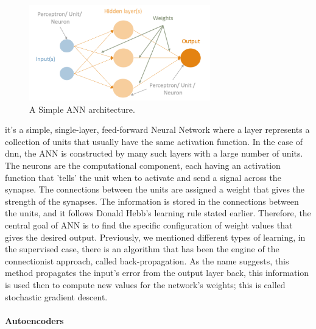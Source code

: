\begin{figure}[!htb]
  \centering\includegraphics[width=0.7\textwidth,height=0.7\textheight,keepaspectratio]{Images/ANN/Basic_ANN.png}
    \caption{A Simple ANN architecture. }
    \label{fig:ann_basic}
\end{figure}
\FloatBarrier

 it's a simple, single-layer, feed-forward Neural Network where a layer represents a collection of units that usually have the same activation function. In the case of \acrfull{dnn}, the ANN is constructed by many such layers with a large number of units. The neurons are the computational component, each having an activation function that 'tells' the unit when to activate and send a signal across the synapse. The connections between the units are assigned a weight that gives the strength of the synapses. The information is stored in the connections between the units, and it follows Donald Hebb's learning rule stated earlier. Therefore, the central goal of ANN is to find the specific configuration of weight values that gives the desired output. Previously, we mentioned different types of learning, in the supervised case, there is an algorithm that has been the engine of the connectionist approach, called back-propagation. As the name suggests, this method propagates the input's error from the output layer back, this information is used then to compute new values for the network's weights; this is called stochastic gradient descent.

\paragraph*{Autoencoders} \label{s:lit:autoencod_overview}

